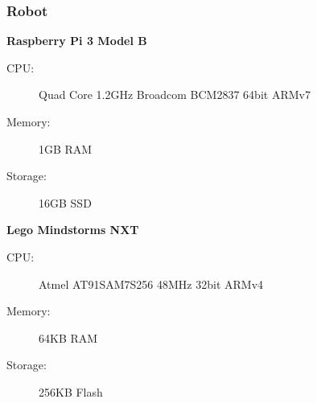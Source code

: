 \documentclass{beamer}
\begin{document}
\begin{frame}
  \frametitle{Robot}

  \begin{multicols}{2}
    \textbf{Raspberry Pi 3 Model B}
    \begin{description}
      \item[CPU:] Quad Core 1.2GHz Broadcom BCM2837 64bit ARMv7
      \item[Memory:] 1GB RAM
      \item[Storage:] 16GB SSD
    \end{description}
    \textbf{Lego Mindstorms NXT}
    \begin{description}
      \item[CPU:] Atmel AT91SAM7S256 48MHz 32bit ARMv4
      \item[Memory:] 64KB RAM
      \item[Storage:] 256KB Flash
    \end{description}
  \end{multicols}


\end{frame}
\end{document}
